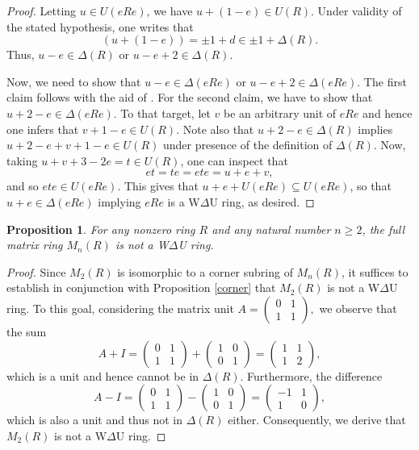 \documentclass[12pt]{amsart}
\newtheorem{proposition}[theorem]{Proposition}
\theoremstyle{definition}
\begin{document}
\begin{proof}
Letting \(u \in U(eRe)\), we have \(u + (1-e) \in U(R)\). Under validity of the stated hypothesis, one writes that \[(u + (1-e))= \pm1 + d \in \pm1 + \Delta(R).\] Thus, \(u -  e \in \Delta(R)\) or $u-e+2\in \Delta(R)$.
	
Now, we need to show that \(u -  e \in \Delta(eRe)\) or $u-e+2\in \Delta(eRe)$. The first claim follows with the aid of \cite[Proposition 2.6]{7}. For the second claim, we have to show that $u+2-e\in \Delta(eRe)$. To that target, let \(v\) be an arbitrary unit of \(eRe\) and hence one infers that \(v + 1 - e \in U(R)\). Note also that \(u + 2-e \in \Delta(R)\) implies \(u + 2-e + v + 1 - e \in U(R)\) under presence of the definition of \(\Delta(R)\). Now, taking \(u + v + 3-2e  = t \in U(R)\), one can inspect that \[ e t = t e = ete = u + e + v ,\] and so \( e t e \in U(eRe) \). This gives that \( u + e + U(eRe) \subseteq U(eRe) \), so that \( u + e \in \Delta(eRe) \) implying \( eRe \) is a W$\Delta$U ring, as desired.
\end{proof}

\begin{proposition}\label{matrix}
For any nonzero ring \( R \) and any natural number \( n \geq 2 \), the full matrix ring \( M_n(R) \) is not a W$\Delta$U ring.
\end{proposition}

\begin{proof}
Since \( M_2(R) \) is isomorphic to a corner subring of \( M_n(R) \), it suffices to establish in conjunction with Proposition \ref{corner} that \( M_2(R) \) is not a W$\Delta$U ring. To this goal, considering the matrix unit
$
A = \begin{pmatrix} 0 & 1 \\ 1 & 1 \end{pmatrix},
$
we observe that the sum
\[
A + I = \begin{pmatrix} 0 & 1 \\ 1 & 1 \end{pmatrix} + \begin{pmatrix} 1 & 0 \\ 0 & 1 \end{pmatrix} = \begin{pmatrix} 1 & 1 \\ 1 & 2 \end{pmatrix},
\]
which is a unit and hence cannot be in $\Delta(R)$. Furthermore, the difference
\[
A - I = \begin{pmatrix} 0 & 1 \\ 1 & 1 \end{pmatrix} - \begin{pmatrix} 1 & 0 \\ 0 & 1 \end{pmatrix} = \begin{pmatrix} -1 & 1 \\ 1 & 0 \end{pmatrix},
\]
which is also a unit and thus not in $\Delta(R)$ either. Consequently, we derive that \( M_2(R) \) is not a W$\Delta$U ring.
\end{proof}
\end{document}
